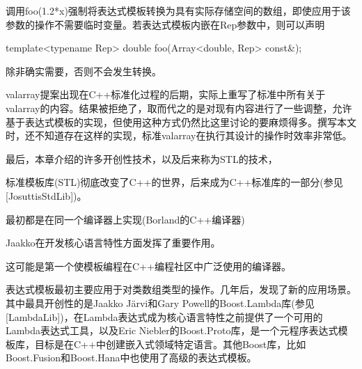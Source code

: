 调用foo(1.2*x)强制将表达式模板转换为具有实际存储空间的数组，即使应用于该参数的操作不需要临时变量。若表达式模板内嵌在Rep参数中，则可以声明

\begin{cpp}
template<typename Rep>
double foo(Array<double, Rep> const&);
\end{cpp}

除非确实需要，否则不会发生转换。

valarray提案出现在C++标准化过程的后期，实际上重写了标准中所有关于valarray的内容。结果被拒绝了，取而代之的是对现有内容进行了一些调整，允许基于表达式模板的实现，但使用这种方式仍然比这里讨论的要麻烦得多。撰写本文时，还不知道存在这样的实现，标准valarray在执行其设计的操作时效率非常低。

最后，本章介绍的许多开创性技术，以及后来称为STL的技术，

\begin{notice}
标准模板库(STL)彻底改变了C++的世界，后来成为C++标准库的一部分(参见[JosuttisStdLib])。
\end{notice}

最初都是在同一个编译器上实现(Borland的C++编译器)

\begin{notice}
Jaakko在开发核心语言特性方面发挥了重要作用。
\end{notice}

这可能是第一个使模板编程在C++编程社区中广泛使用的编译器。

表达式模板最初主要应用于对类数组类型的操作。几年后，发现了新的应用场景。其中最具开创性的是Jaakko J{\"a}rvi和Gary Powell的Boost.Lambda库(参见[LambdaLib])，在Lambda表达式成为核心语言特性之前提供了一个可用的Lambda表达式工具，以及Eric Niebler的Boost.Proto库，是一个元程序表达式模板库，目标是在C++中创建嵌入式领域特定语言。其他Boost库，比如Boost.Fusion和Boost.Hana中也使用了高级的表达式模板。



































